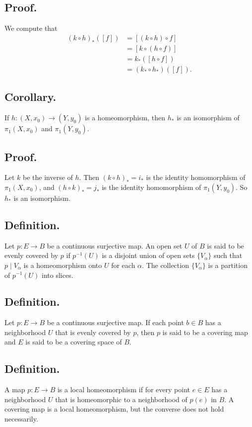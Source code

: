 \documentclass[titlepage]{article}
\begin{document}
\subsection{Proof.} We compute that 
\begin{align*}
    (k \circ h)_{*}([f]) &= [(k \circ h) \circ f] \\
                         &= [k \circ (h \circ f)] \\
                         &= k_{*}([h \circ f]) \\
                         &= (k_{*} \circ h_{*})([f]).
\end{align*}

\subsection{Corollary.} If $h: (X, x_{0}) \to (Y, y_{0})$ is a homeomorphism, then $h_{*}$ is an isomorphism of $\pi_{1}(X, x_{0})$ and $\pi_{1}(Y, y_{0})$.

\subsection{Proof.} Let $k$ be the inverse of $h$. Then $(k \circ h)_{*} = i_{*}$ is the identity homomorphism of $\pi_{1}(X, x_{0})$, and $(h \circ k)_{*} = j_{*}$ is the identity homomorphism of $\pi_{1}(Y, y_{0})$. So $h_{*}$ is an isomorphism.

\subsection{Definition.} Let $p: E \to B$ be a continuous surjective map. An open set $U$ of $B$ is said to be evenly covered by $p$ if $p^{-1}(U)$ is a disjoint union of open sets $\{V_{\alpha}\}$ such that $p \mid V_{\alpha}$ is a homeomorphism onto $U$ for each $\alpha$. The collection $\{V_{\alpha}\}$ is a partition of $p^{-1}(U)$ into slices.

\subsection{Definition.} Let $p: E \to B$ be a continuous surjective map. If each point $b \in B$ has a neighborhood $U$ that is evenly covered by $p$, then $p$ is said to be a covering map and $E$ is said to be a covering space of $B$.

\subsection{Definition.} A map $p: E \to B$ is a local homeomorphism if for every point $e \in E$ has a neighborhood $U$ that is homeomorphic to a neighborhood of $p(e)$ in $B$. A covering map is a local homeomorphism, but the converse does not hold necessarily.
\end{document}
